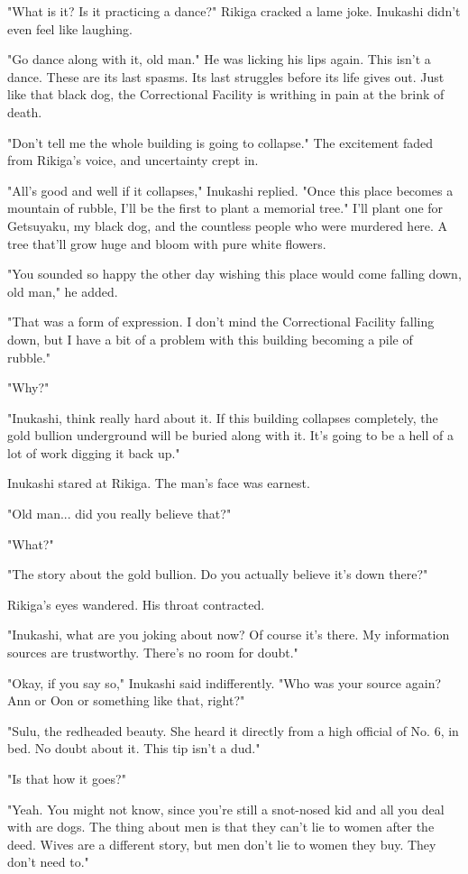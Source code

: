 "What is it? Is it practicing a dance?" Rikiga cracked a lame joke.
Inukashi didn't even feel like laughing.

"Go dance along with it, old man." He was licking his lips again. This
isn't a dance. These are its last spasms. Its last struggles before its
life gives out. Just like that black dog, the Correctional Facility is
writhing in pain at the brink of death.

"Don't tell me the whole building is going to collapse." The excitement
faded from Rikiga's voice, and uncertainty crept in.

"All's good and well if it collapses," Inukashi replied. "Once this
place becomes a mountain of rubble, I'll be the first to plant a
memorial tree." I'll plant one for Getsuyaku, my black dog, and the
countless people who were murdered here. A tree that'll grow huge and
bloom with pure white flowers.

"You sounded so happy the other day wishing this place would come
falling down, old man," he added.

"That was a form of expression. I don't mind the Correctional Facility
falling down, but I have a bit of a problem with this building becoming
a pile of rubble."~

"Why?"

"Inukashi, think really hard about it. If this building collapses
completely, the gold bullion underground will be buried along with it.
It's going to be a hell of a lot of work digging it back up."

Inukashi stared at Rikiga. The man's face was earnest.

"Old man... did you really believe that?"

"What?"

"The story about the gold bullion. Do you actually believe it's down
there?"

Rikiga's eyes wandered. His throat contracted.

"Inukashi, what are you joking about now? Of course it's there. My
information sources are trustworthy. There's no room for doubt."

"Okay, if you say so," Inukashi said indifferently. "Who was your source
again? Ann or Oon or something like that, right?"

"Sulu, the redheaded beauty. She heard it directly from a high official
of No. 6, in bed. No doubt about it. This tip isn't a dud."

"Is that how it goes?"

"Yeah. You might not know, since you're still a snot-nosed kid and all
you deal with are dogs. The thing about men is that they can't lie to
women after the deed. Wives are a different story, but men don't lie to
women they buy. They don't need to."

